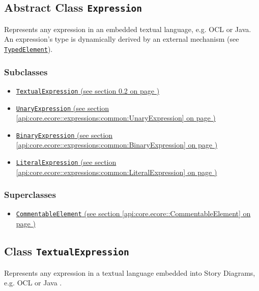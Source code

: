 \subsection{Abstract Class \texttt{Expression}}
\label{api:core.ecore::expressions:Expression}
Represents any expression in an embedded textual language, e.g. OCL or Java. An expression's type is dynamically derived by an external mechanism (see \hyperref[TypedElement]{\texttt{TypedElement}}).
\subsubsection*{Subclasses}
\begin{itemize}
\item \hyperref[api:core.ecore::expressions:TextualExpression]{\texttt{TextualExpression} (see section \ref*{api:core.ecore::expressions:TextualExpression} on page \pageref*{api:core.ecore::expressions:TextualExpression})}
\item \hyperref[api:core.ecore::expressions:common:UnaryExpression]{\texttt{UnaryExpression} (see section \ref*{api:core.ecore::expressions:common:UnaryExpression} on page \pageref*{api:core.ecore::expressions:common:UnaryExpression})}
\item \hyperref[api:core.ecore::expressions:common:BinaryExpression]{\texttt{BinaryExpression} (see section \ref*{api:core.ecore::expressions:common:BinaryExpression} on page \pageref*{api:core.ecore::expressions:common:BinaryExpression})}
\item \hyperref[api:core.ecore::expressions:common:LiteralExpression]{\texttt{LiteralExpression} (see section \ref*{api:core.ecore::expressions:common:LiteralExpression} on page \pageref*{api:core.ecore::expressions:common:LiteralExpression})}
\end{itemize}
\subsubsection*{Superclasses}
\begin{itemize}
\item \hyperref[api:core.ecore::CommentableElement]{\texttt{CommentableElement} (see section \ref*{api:core.ecore::CommentableElement} on page \pageref*{api:core.ecore::CommentableElement})}
\end{itemize}
\subsection{Class \texttt{TextualExpression}}
\label{api:core.ecore::expressions:TextualExpression}
Represents any expression in a textual language embedded into Story Diagrams, e.g. OCL or Java .
